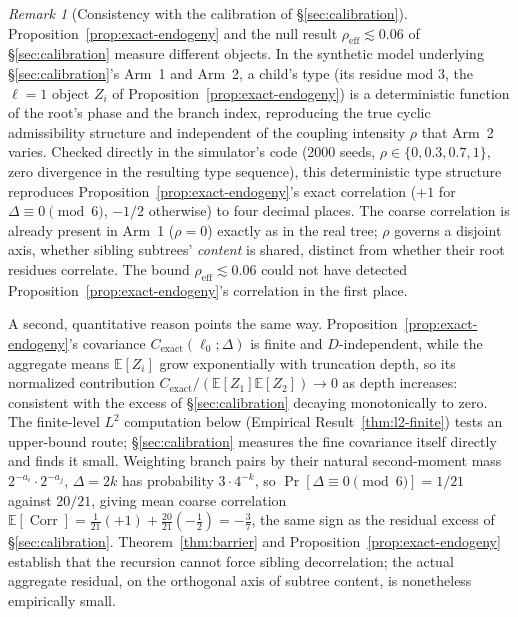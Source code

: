 \documentclass[11pt]{article}
\theoremstyle{definition}
\theoremstyle{remark}
\newtheorem{remark}[theorem]{Remark}
\DeclareMathOperator{\Corr}{Corr}
\begin{document}
\begin{remark}[Consistency with the calibration of \S\ref{sec:calibration}]
\label{rem:calibration-consistency}
Proposition~\ref{prop:exact-endogeny} and the null result
$\rho_{\mathrm{eff}}\lesssim 0.06$ of \S\ref{sec:calibration} measure
different objects. In the synthetic model underlying
\S\ref{sec:calibration}'s Arm~1 and Arm~2, a child's type (its residue
mod $3$, the $\ell=1$ object $Z_i$ of Proposition~\ref{prop:exact-endogeny})
is a deterministic function of the root's phase and the branch index,
reproducing the true cyclic admissibility structure and independent of
the coupling intensity $\rho$ that Arm~2 varies. Checked directly in
the simulator's code (2000 seeds, $\rho\in\{0,0.3,0.7,1\}$, zero
divergence in the resulting type sequence), this deterministic type
structure reproduces Proposition~\ref{prop:exact-endogeny}'s exact
correlation ($+1$ for $\Delta\equiv0\pmod6$, $-1/2$ otherwise) to four
decimal places. The coarse correlation is already present in Arm~1
($\rho=0$) exactly as in the real tree; $\rho$ governs a disjoint axis,
whether sibling subtrees' \emph{content} is shared, distinct from
whether their root residues correlate. The bound $\rho_{\mathrm{eff}}\lesssim0.06$
could not have detected Proposition~\ref{prop:exact-endogeny}'s
correlation in the first place.

A second, quantitative reason points the same way.
Proposition~\ref{prop:exact-endogeny}'s covariance
$C_{\mathrm{exact}}(\ell_0;\Delta)$ is finite and $D$-independent, while
the aggregate means $\mathbb{E}[Z_i]$ grow exponentially with
truncation depth, so its normalized contribution
$C_{\mathrm{exact}}/(\mathbb{E}[Z_1]\mathbb{E}[Z_2])\to0$ as depth
increases: consistent with the excess of \S\ref{sec:calibration}
decaying monotonically to zero. The finite-level $L^2$ computation
below (Empirical Result~\ref{thm:l2-finite}) tests an upper-bound
route; \S\ref{sec:calibration} measures the fine covariance itself
directly and finds it small. Weighting branch pairs by their
natural second-moment mass $2^{-a_i}\cdot2^{-a_j}$, $\Delta=2k$ has
probability $3\cdot4^{-k}$, so $\Pr[\Delta\equiv0\!\!\pmod6]=1/21$
against $20/21$, giving mean coarse correlation
$\mathbb{E}[\Corr]=\tfrac{1}{21}(+1)+\tfrac{20}{21}(-\tfrac12)=-\tfrac37$,
the same sign as the residual excess of \S\ref{sec:calibration}.
Theorem~\ref{thm:barrier} and Proposition~\ref{prop:exact-endogeny}
establish that the recursion cannot force sibling decorrelation; the
actual aggregate residual, on the orthogonal axis of subtree content,
is nonetheless empirically small.
\end{remark}
\end{document}
